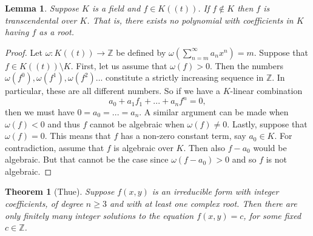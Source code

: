 \documentclass{article}
\newtheorem{theorem}{Theorem}[section]
\newtheorem{lemma}{Lemma}[section]
\newcommand{\mbb}[1]{\mathbb{#1}}
\begin{document}
\begin{lemma}\label{lem: Unit power series is transcendental}
    Suppose $K$ is a field and $f \in K((t))$. If $f \notin K$ then $f$ is transcendental over $K$. That is, there exists no polynomial with coefficients in $K$ having $f$ as a root. 
\end{lemma}
\begin{proof}
    Let $\omega : K((t)) \to \mbb Z$ be defined by $\omega(\sum_{n = m}^\infty a_n x^n) = m$. Suppose that $f \in K((t)) \setminus K$. First, let us assume that $\omega(f) > 0$. Then the numbers $\omega(f^0), \omega(f^1),\omega(f^2) ...$ constitute a strictly increasing sequence in $\mbb Z$. In particular, these are all different numbers. So if we have a $K$-linear combination
    $$a_0 + a_1 f_1 + ... + a_nf^n = 0,$$
    then we must have $0 = a_0 = ... = a_n$. A similar argument can be made when $\omega(f) < 0$ and thus $f$ cannot be algebraic when $\omega(f) \neq 0$. Lastly, suppose that $\omega(f) = 0$. This means that $f$ has a non-zero constant term, say $a_0 \in K$. For contradiction, assume that $f$ is algebraic over $K$. Then also $f - a_0$ would be algebraic. But that cannot be the case since $\omega(f - a_0) > 0$ and so $f$ is not algebraic.  
\end{proof}

\begin{theorem}[Thue]\label{thm: Thues theorem}
    Suppose $f(x,y)$ is an irreducible form with integer coefficients, of degree $n \geq 3$ and with at least one complex root. Then there are only finitely many integer solutions to the equation $f(x,y) = c$, for some fixed $c \in \mbb{Z}$.
\end{theorem}
\end{document}
